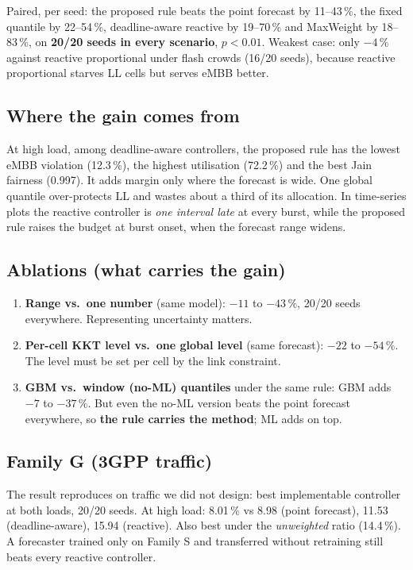 \documentclass[11pt,a4paper]{article}
\begin{document}
Paired, per seed: the proposed rule beats the point forecast by 11--43\,\%, the fixed quantile by 22--54\,\%, deadline-aware reactive by 19--70\,\% and MaxWeight by 18--83\,\%, on \textbf{20/20 seeds in every scenario}, $p < 0.01$. Weakest case: only $-4\,\%$ against reactive proportional under flash crowds (16/20 seeds), because reactive proportional starves LL cells but serves eMBB better.

\subsection{Where the gain comes from}

At high load, among deadline-aware controllers, the proposed rule has the lowest eMBB violation (12.3\,\%), the highest utilisation (72.2\,\%) and the best Jain fairness (0.997). It adds margin only where the forecast is wide. One global quantile over-protects LL and wastes about a third of its allocation. In time-series plots the reactive controller is \emph{one interval late} at every burst, while the proposed rule raises the budget at burst onset, when the forecast range widens.

\subsection{Ablations (what carries the gain)}

\begin{enumerate}
  \item \textbf{Range vs.\ one number} (same model): $-11$ to $-43\,\%$, 20/20 seeds everywhere. Representing uncertainty matters.
  \item \textbf{Per-cell KKT level vs.\ one global level} (same forecast): $-22$ to $-54\,\%$. The level must be set per cell by the link constraint.
  \item \textbf{GBM vs.\ window (no-ML) quantiles} under the same rule: GBM adds $-7$ to $-37\,\%$. But even the no-ML version beats the point forecast everywhere, so \textbf{the rule carries the method}; ML adds on top.
\end{enumerate}

\subsection{Family G (3GPP traffic)}

The result reproduces on traffic we did not design: best implementable controller at both loads, 20/20 seeds. At high load: 8.01\,\% vs 8.98 (point forecast), 11.53 (deadline-aware), 15.94 (reactive). Also best under the \emph{unweighted} ratio (14.4\,\%). A forecaster trained only on Family S and transferred without retraining still beats every reactive controller.
\end{document}
